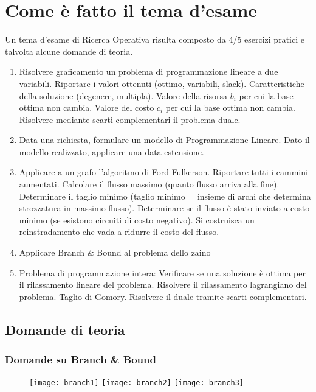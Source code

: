 \documentclass[\main/main.tex]{subfiles}
\begin{document}
\chapter{Come è fatto il tema d'esame}

Un tema d'esame di Ricerca Operativa risulta composto da 4/5 esercizi pratici e talvolta alcune domande di teoria.

\begin{enumerate}
  \item Risolvere graficamento un problema di programmazione lineare a due variabili.
        \subitem Riportare i valori ottenuti (ottimo, variabili, slack).
        \subitem Caratteristiche della soluzione (degenere, multipla).
        \subitem Valore della risorsa $b_i$ per cui la base ottima non cambia.
        \subitem Valore del costo $c_i$ per cui la base ottima non cambia.
        \subitem Risolvere mediante scarti complementari il problema duale.
  \item Data una richiesta, formulare un modello di Programmazione Lineare.
        \subitem Dato il modello realizzato, applicare una data estensione.
  \item Applicare a un grafo l'algoritmo di Ford-Fulkerson.
        \subitem Riportare tutti i cammini aumentati.
        \subitem Calcolare il flusso massimo (quanto flusso arriva alla fine).
        \subitem Determinare il taglio minimo (taglio minimo = insieme di archi che determina strozzatura in massimo flusso).
        \subitem Determinare se il flusso è stato inviato a costo minimo (se esistono circuiti di costo negativo).
        \subitem Si costruisca un reinstradamento che vada a ridurre il costo del flusso.
  \item Applicare Branch \& Bound al problema dello zaino
  \item Problema di programmazione intera:
        \subitem Verificare se una soluzione è ottima per il rilassamento lineare del problema.
        \subitem Risolvere il rilassamento lagrangiano del problema.
        \subitem Taglio di Gomory.
        \subitem Risolvere il duale tramite scarti complementari.
\end{enumerate}

\section{Domande di teoria}

\subsection{Domande su Branch \& Bound}
\begin{figure}
  \texttt{[image: branch1]}
  \texttt{[image: branch2]}
  \texttt{[image: branch3]}
\end{figure}
\end{document}
